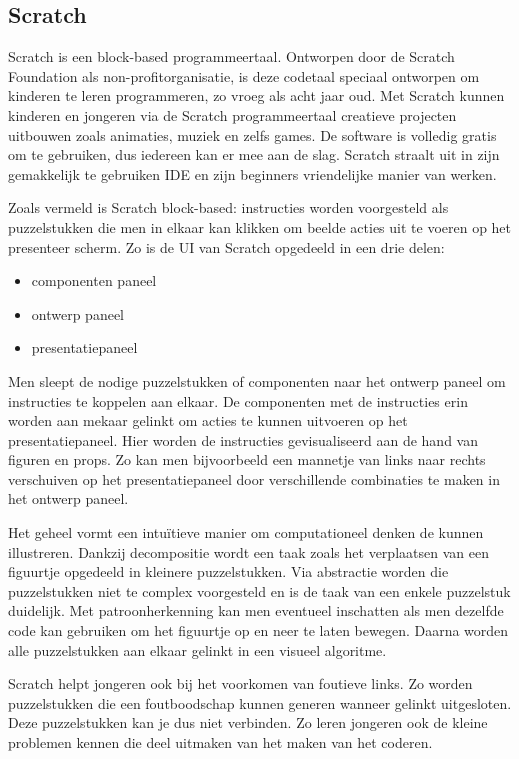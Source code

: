 \subsection{Scratch}

Scratch is een block-based programmeertaal. Ontworpen door de Scratch Foundation als non-profitorganisatie, is deze codetaal speciaal ontworpen om kinderen te leren programmeren, zo vroeg als acht jaar oud. Met Scratch kunnen kinderen en jongeren via de Scratch programmeertaal creatieve projecten uitbouwen zoals animaties, muziek en zelfs games. De software is volledig gratis om te gebruiken, dus iedereen kan er mee aan de slag. Scratch straalt uit in zijn gemakkelijk te gebruiken IDE en zijn beginners vriendelijke manier van werken.

Zoals vermeld is Scratch block-based: instructies worden voorgesteld als puzzelstukken die men in elkaar kan klikken om beelde acties uit te voeren op het presenteer scherm. Zo is de UI van Scratch opgedeeld in een drie delen:
\begin{itemize}
    \item componenten paneel
    \item ontwerp paneel
    \item presentatiepaneel
\end{itemize}

Men sleept de nodige puzzelstukken of componenten naar het ontwerp paneel om instructies te koppelen aan elkaar. De componenten met de instructies erin worden aan mekaar gelinkt om acties te kunnen uitvoeren op het presentatiepaneel. Hier worden de instructies gevisualiseerd aan de hand van figuren en props. Zo kan men bijvoorbeeld een mannetje van links naar rechts verschuiven op het presentatiepaneel door verschillende combinaties te maken in het ontwerp paneel. 

Het geheel vormt een intuïtieve manier om computationeel denken de kunnen illustreren. Dankzij decompositie wordt een taak zoals het verplaatsen van een figuurtje opgedeeld in kleinere puzzelstukken. Via abstractie worden die puzzelstukken niet te complex voorgesteld en is de taak van een enkele puzzelstuk duidelijk. Met patroonherkenning kan men eventueel inschatten als men dezelfde code kan gebruiken om het figuurtje op en neer te laten bewegen. Daarna worden alle puzzelstukken aan elkaar gelinkt in een visueel algoritme. 

Scratch helpt jongeren ook bij het voorkomen van foutieve links. Zo worden puzzelstukken die een foutboodschap kunnen generen wanneer gelinkt uitgesloten. Deze puzzelstukken kan je dus niet verbinden. Zo leren jongeren ook de kleine problemen kennen die deel uitmaken van het maken van het coderen.

